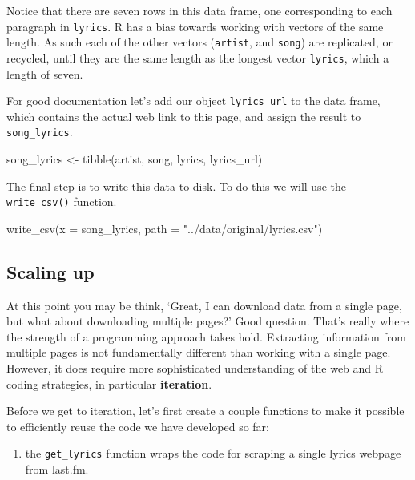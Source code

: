 \documentclass[
  letterpaper,
]{scrbook}
\newenvironment{Shaded}{\begin{snugshade}}{\end{snugshade}}
\newcommand{\AttributeTok}[1]{\textcolor[rgb]{0.00,0.00,0.00}{#1}}
\newcommand{\FunctionTok}[1]{\textcolor[rgb]{0.00,0.00,0.00}{#1}}
\newcommand{\NormalTok}[1]{\textcolor[rgb]{0.00,0.00,0.00}{#1}}
\newcommand{\OtherTok}[1]{\textcolor[rgb]{0.00,0.00,0.00}{#1}}
\newcommand{\StringTok}[1]{\textcolor[rgb]{0.00,0.00,0.00}{#1}}
\providecommand{\tightlist}{%
  \setlength{\itemsep}{0pt}\setlength{\parskip}{0pt}}\usepackage{longtable,booktabs,array}
\begin{document}
Notice that there are seven rows in this data frame, one corresponding
to each paragraph in \texttt{lyrics}. R has a bias towards working with
vectors of the same length. As such each of the other vectors
(\texttt{artist}, and \texttt{song}) are replicated, or recycled, until
they are the same length as the longest vector \texttt{lyrics}, which a
length of seven.

For good documentation let's add our object \texttt{lyrics\_url} to the
data frame, which contains the actual web link to this page, and assign
the result to \texttt{song\_lyrics}.

\begin{Shaded}
\begin{Highlighting}[]
\NormalTok{song\_lyrics }\OtherTok{\textless{}{-}} \FunctionTok{tibble}\NormalTok{(artist, song, lyrics, lyrics\_url)}
\end{Highlighting}
\end{Shaded}

The final step is to write this data to disk. To do this we will use the
\texttt{write\_csv()} function.

\begin{Shaded}
\begin{Highlighting}[]
\FunctionTok{write\_csv}\NormalTok{(}\AttributeTok{x =}\NormalTok{ song\_lyrics, }\AttributeTok{path =} \StringTok{"../data/original/lyrics.csv"}\NormalTok{)}
\end{Highlighting}
\end{Shaded}

\hypertarget{scaling-up}{%
\subsection{Scaling up}\label{scaling-up}}

At this point you may be think, `Great, I can download data from a
single page, but what about downloading multiple pages?' Good question.
That's really where the strength of a programming approach takes hold.
Extracting information from multiple pages is not fundamentally
different than working with a single page. However, it does require more
sophisticated understanding of the web and R coding strategies, in
particular \textbf{iteration}.

Before we get to iteration, let's first create a couple functions to
make it possible to efficiently reuse the code we have developed so far:

\begin{enumerate}
\def\labelenumi{\arabic{enumi}.}
\tightlist
\item
  the \texttt{get\_lyrics} function wraps the code for scraping a single
  lyrics webpage from last.fm.
\end{enumerate}
\end{document}
